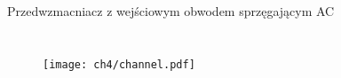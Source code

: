 \begin{frame}{Przedwzmacniacz z wejściowym obwodem sprzęgającym AC}
    \begin{columns}

    \begin{figure}[H]
        \centering
        \texttt{[image: ch4/channel.pdf]} 
    \end{figure}   


    \begin{block}{
    }
    {\renewcommand\normalsize{\small}%
    \normalsize
    }
    \end{block}
    \end{columns}   
  
\end{frame}



